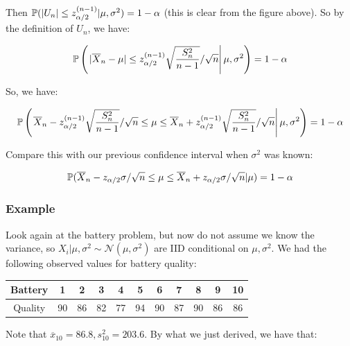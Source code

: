 \documentclass[a4paper]{article}
\begin{document}

            Then $\mathbb{P}(|U_n| \leq z_{\alpha/2}^{(n-1)} | \mu, \sigma^2) = 1 -
            \alpha$ (this is clear from the figure above). So by the definition
            of $U_n$, we have:

            \[
                \mathbb{P}\left(\left.|\overline X_n - \mu| \leq z_{\alpha/2}
                ^{(n-1)}\sqrt{\frac{S_n^2}{n-1}} / \sqrt{n} \right| \mu,
                \sigma^2\right) = 1 - \alpha
            \]

            So, we have:

            \[
                \mathbb{P}\left(\left.\overline X_n - z_{\alpha/2}^{(n-1)}
                \sqrt{\frac{S_n^2}{n - 1}} / \sqrt{n} \leq \mu \leq \overline
                X_n + z_{\alpha/2}^{(n - 1)} \sqrt{\frac{S_n^2}{n - 1}} /
                \sqrt{n} \right| \mu, \sigma^2\right) = 1 - \alpha
            \]

            Compare this with our previous confidence interval when $\sigma^2$
            was known:

            \[
                \mathbb{P}(\overline X_n - z_{\alpha/2}\sigma/\sqrt{n} \leq \mu \leq
                \overline X_n + z_{\alpha/2} \sigma/\sqrt{n} | \mu) = 1 - \alpha
            \]

            \subsubsection{Example}
                Look again at the battery problem, but now do not assume we know
                the variance, so $X_i | \mu, \sigma^2 \sim \mathcal{N}(\mu,
                \sigma^2)$ are IID conditional on $\mu, \sigma^2$. We had the
                following observed values for battery quality:

                \begin{center}
                    \begin{tabular}{c | c c c c c c c c c c}
                        Battery & 1 & 2 & 3 & 4 & 5 & 6 & 7 & 8 & 9 & 10 \\
                        \hline
                        Quality & 90 & 86 & 82 & 77 & 94 & 90 & 87 & 90 & 86 &
                            86
                    \end{tabular}
                \end{center}

                Note that $\overline x_{10} = 86.8, s_{10}^2 = 203.6$. By what
                we just derived, we have that:
\end{document}
